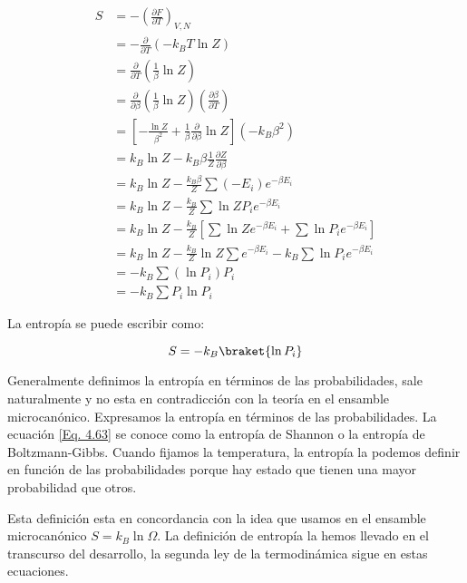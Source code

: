 \documentclass[11pt,fleqn]{book}
\begin{document}
\begin{equation}
    \begin{split}
        S&=-\left(\frac{\partial F}{\partial T}\right)_{V,N}\\
        &=-\frac{\partial }{\partial T} (-k_{B}T\ln{Z})\\
        &=\frac{\partial}{\partial T}(\frac{1}{\beta}\ln{Z})\\
        &=\frac{\partial}{\partial\beta}\left(\frac{1}{\beta}\ln{Z}\right)\left(\frac{\partial\beta}{\partial T}\right) \\
        &=\left[-\frac{\ln{Z}}{\beta^{2}}+\frac{1}{\beta}\frac{\partial}{\partial\beta}\ln{Z}\right](-k_{B}\beta^{2})\\
        &=k_{B}\ln{Z}-k_{B}\beta\frac{1}{Z}\frac{\partial Z}{\partial\beta}\\
        &=k_{B}\ln{Z}-\frac{k_{B}\beta}{Z}\sum(-E_{i})e^{-\beta E_{i}}\\
        &=k_{B}\ln{Z}-\frac{k_{B}}{Z}\sum\ln{ZP_{i}}e^{-\beta E_{i}}\\
        &=k_{B}\ln{Z}-\frac{k_{B}}{Z}\left[\sum\ln{Z}e^{-\beta E_{i}}+\sum\ln{P_{i}}e^{-\beta E_{i}}\right]\\
        &=k_{B}\ln{Z}-\frac{k_{B}}{Z}\ln{Z}\sum e^{-\beta E_{i}}-k_{B}\sum\ln{P_{i}}e^{-\beta E_{i}}\\
        &=-k_{B}\sum(\ln{P_{i}})P_{i}\\
        &=-k_{B}\sum P_{i}\ln{P_{i}}
    \end{split}
    \label{Eq. 4.62}
\end{equation}  

La entropía se puede escribir como:

\begin{equation}
    S=-k_{B}\braket{\ln{P_{i}}}
    \label{Eq. 4.63}
\end{equation}

Generalmente definimos la entropía en términos de las probabilidades, sale naturalmente y no esta en contradicción con la teoría en el ensamble microcanónico. Expresamos la entropía en términos de las probabilidades. La ecuación \ref{Eq. 4.63} se conoce como la entropía de Shannon o la entropía de Boltzmann-Gibbs. Cuando fijamos la temperatura, la entropía la podemos definir en función de las probabilidades porque hay estado que tienen una mayor probabilidad que otros.

Esta definición esta en concordancia con la idea que usamos en el ensamble microcanónico $S=k_{B}\ln{\Omega}$. La definición de entropía la hemos llevado en el transcurso del desarrollo, la segunda ley de la termodinámica sigue en estas ecuaciones.
    
\end{document}
